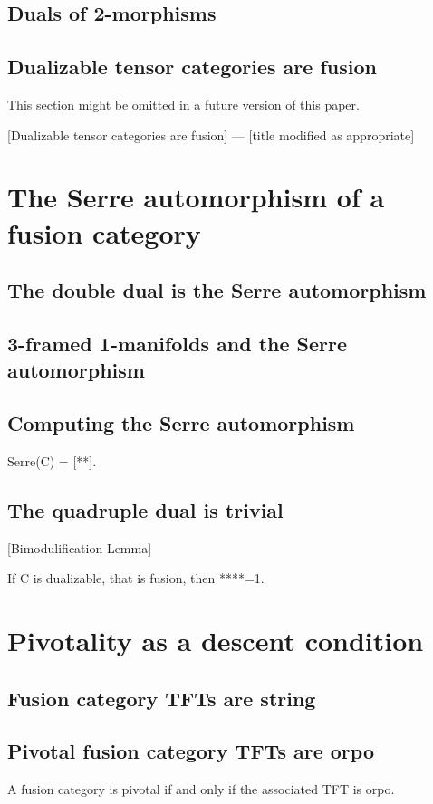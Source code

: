 \documentclass{amsart}
\begin{document}
\subsection{Duals of 2-morphisms}
\subsection{Dualizable tensor categories are fusion}

This section might be omitted in a future version of this paper. 

[Dualizable tensor categories are fusion] --- [title modified as appropriate]

\section{The Serre automorphism of a fusion category}


\subsection{The double dual is the Serre automorphism}
\subsection{3-framed 1-manifolds and the Serre automorphism}
\subsection{Computing the Serre automorphism}
\begin{theorem}
Serre(C) = [**].
\end{theorem}
\subsection{The quadruple dual is trivial}
[Bimodulification Lemma]
\begin{theorem} 
If C is dualizable, that is fusion, then ****=1.
\end{theorem}
%

\section{Pivotality as a descent condition}

\subsection{Fusion category TFTs are string}
\subsection{Pivotal fusion category TFTs are orpo}
\begin{theorem}
A fusion category is pivotal if and only if the associated TFT is orpo.
\end{theorem}
\end{document}

